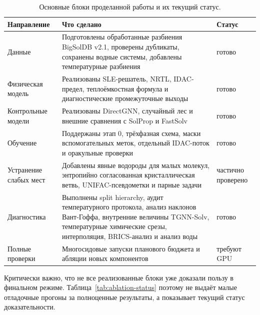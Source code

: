 \documentclass[11pt]{article}
\theoremstyle{definition}
\begin{document}
\begin{table}[H]
\centering
\caption{Основные блоки проделанной работы и их текущий статус.}
\label{tab:implemented-work}
\small
\begin{tabularx}{\textwidth}{P{0.22\textwidth}Y P{0.18\textwidth}}
\toprule
Направление & Что сделано & Статус \\
\midrule
Данные & Подготовлены обработанные разбиения BigSolDB v2.1, проверены дубликаты, сохранены водные системы, добавлены температурные разбиения & готово \\
Физическая модель & Реализованы SLE-решатель, NRTL, IDAC-предел, теплоёмкостная формула и диагностические промежуточные выходы & готово \\
Контрольные модели & Реализованы DirectGNN, случайный лес и внешние сравнения с SolProp и FastSolv & готово \\
Обучение & Поддержаны этап 0, трёхфазная схема, маски вспомогательных меток, отдельный IDAC-поток и оракульные проверки & готово \\
Устранение слабых мест & Добавлены явные водороды для малых молекул, энтропийно согласованная кристаллическая ветвь, UNIFAC-псевдометки и парные задачи & частично проверено \\
Диагностика & Выполнены split hierarchy, аудит температурного протокола, анализ наклонов Вант-Гоффа, внутренние величины TGNN-Solv, температурные химические срезы, интерполяция, BRICS-анализ и анализ воды & готово \\
Полные проверки & Многосидовые запуски планового бюджета и абляции новых компонентов & требуют GPU \\
\bottomrule
\end{tabularx}
\end{table}

Критически важно, что не все реализованные блоки уже доказали пользу в финальном режиме. Таблица~\ref{tab:ablation-status} поэтому не выдаёт малые отладочные прогоны за полноценные результаты, а показывает текущий статус доказательности.
\end{document}
